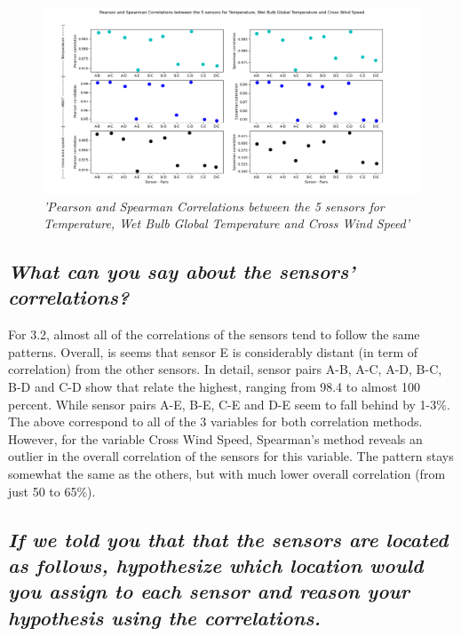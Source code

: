 \documentclass[a4paper,12pt]{article} %
\begin{document}
\begin{figure}[H]
\centering
\includegraphics[width=\textwidth]{Graphs/Pearson-Spearman_5_sensors_Temp,_WBGT,CrWinSpeed.png}
\caption{\it'Pearson and Spearman Correlations between the 5 sensors for Temperature, Wet Bulb Global Temperature and Cross Wind Speed'}
\end{figure}




\subsection{\it What can you say about the sensors’ correlations?}





For 3.2, almost all of the correlations of the 
sensors tend to follow the same patterns. Overall, is seems that sensor E 
is considerably distant (in term of correlation) from the other sensors. In 
detail, sensor pairs A-B, A-C, A-D, B-C, B-D and C-D show that relate the highest, 
ranging from 98.4 to almost 100 percent. While sensor pairs A-E, B-E, C-E and 
D-E seem to fall behind by 1-3\%. The above correspond to all of the 3 variables for both correlation methods. 
However, for the variable Cross Wind Speed, Spearman’s method reveals an outlier in the overall correlation 
of the sensors for this variable. The pattern stays somewhat the same as the others, but with much lower overall correlation (from just 50 to 65\%). 




\subsection{\it If we told you that that the sensors are located as follows, hypothesize which location would you assign to each sensor and reason your hypothesis using the correlations.}
\end{document}

